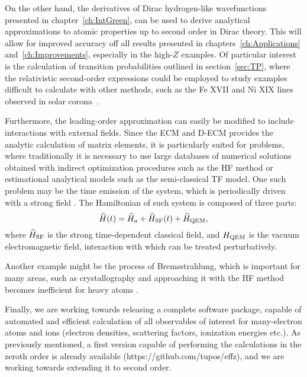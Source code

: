 On the other hand, the derivatives of Dirac hydrogen-like wavefunctions presented in chapter~\ref{ch:IntGreen}, can be used to derive analytical approximations to atomic properties up to second order in Dirac theory. This will allow for improved accuracy off all results presented in chapters~\ref{ch:Applications} and~\ref{ch:Improvements}, especially in the high-$Z$ examples. Of particular interest is the calculation of transition probabilities outlined in section~\ref{sec:TP}, where the relativistic second-order expressions could be employed to study examples difficult to calculate with other methods, such as the Fe XVII and Ni XIX lines observed in solar corona~\cite{SolarIron}.
			
Furthermore, the leading-order
approximation can easily be modified to include interactions with
external fields. Since the ECM and D-ECM provides the analytic calculation of matrix elements, it is particularly suited for problems, where traditionally it is necessary to use large databases of numerical solutions obtained with indirect optimization procedures such as the HF method or estimational analytical models such as the semi-classical TF model. One such problem may be the time emission of the system, which is periodically driven with a strong field \cite{feranchuk_new_2002}. The Hamiltonian of such system is composed of three parts:
	\begin{equation}
	\widehat{H}(t) = 	\widehat{H}_a + \widehat{H}_{\rm{SF}}(t) + 	\widehat{H}_{\rm{QEM}} ,
	\end{equation}
	where $	\widehat{H}_{\rm{SF}}$ is the strong time-dependent classical field, and $H_{\rm{QEM}}$ is the vacuum electromagnetic field, interaction with which can be treated perturbatively.
	
	Another example might be the process of Bremsstrahlung, which is important for many areas, such as crystallography and approaching it with the HF method becomes inefficient for heavy atoms \cite{PhysRev93788}.
	
		Finally, we are working towards releasing a complete software package, capable of automated and efficient calculation of all observables of interest for many-electron atoms and ions (electron densities, scattering factors, ionization energies etc.). As previously mentioned, a first version capable of performing the calculations in the zeroth order is already available (https://github.com/tupos/effz), and we are working towards extending it to second order.